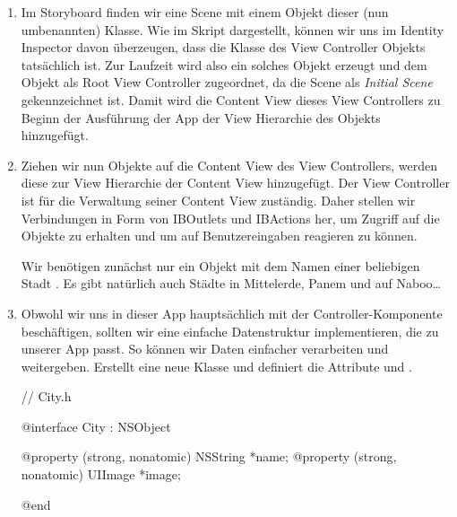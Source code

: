 \documentclass[parskip=half, final]{scrreprt}
\begin{document}
\begin{lecture}
\begin{enumerate}

\item Im Storyboard finden wir eine Scene mit einem Objekt dieser (nun umbenannten)  Klasse. Wie im Skript dargestellt, können wir uns im Identity Inspector davon überzeugen, dass die Klasse des View Controller Objekts tatsächlich  ist. Zur Laufzeit wird also ein solches Objekt erzeugt und dem  Objekt als Root View Controller zugeordnet, da die Scene als \emph{Initial Scene} gekennzeichnet ist. Damit wird die Content View dieses View Controllers zu Beginn der Ausführung der App der View Hierarchie des  Objekts hinzugefügt.

\item Ziehen wir nun  Objekte auf die Content View des View Controllers, werden diese zur View Hierarchie der Content View hinzugefügt. Der View Controller ist für die Verwaltung seiner Content View zuständig. Daher stellen wir Verbindungen in Form von IBOutlets und IBActions her, um Zugriff auf die Objekte zu erhalten und um auf Benutzereingaben reagieren zu können.

Wir benötigen zunächst nur ein  Objekt mit dem Namen einer beliebigen Stadt . Es gibt natürlich auch Städte in Mittelerde, Panem und auf Naboo…


\item Obwohl wir uns in dieser App hauptsächlich mit der Controller-Komponente beschäftigen, sollten wir eine einfache Datenstruktur implementieren, die zu unserer App passt. So können wir Daten einfacher verarbeiten und weitergeben. Erstellt eine neue Klasse  und definiert die Attribute  und .

\begin{objclst}
// City.h

@interface City : NSObject

@property (strong, nonatomic) NSString *name;
@property (strong, nonatomic) UIImage *image;

@end
\end{objclst}


\end{enumerate}
\end{lecture}
\end{document}
